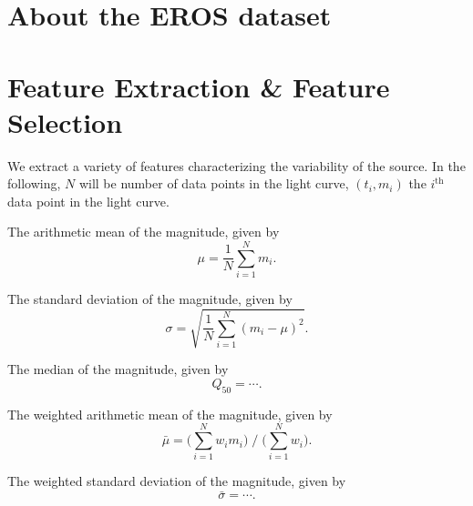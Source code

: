 \section{About the EROS dataset}


\section{Feature Extraction \& Feature Selection}

We extract a variety of features characterizing the variability of the source. In the following, $N$ will be number of data points in the light curve, $(t_i, m_i)$ the $i^{\text{th}}$ data point in the light curve.

\begin{enumerate}

 The arithmetic mean of the magnitude, given by
\begin{equation}\mu = \frac{1}{N} \sum\limits_{i=1}^{N} m_i.\end{equation}

 The standard deviation of the magnitude, given by
\begin{equation}\sigma = \sqrt{\frac{1}{N} \sum_{i=1}^N (m_i - \mu)^2}.\end{equation}

 The median of the magnitude, given by
\begin{equation}Q_{50} = \cdots.\end{equation}

 The weighted arithmetic mean of the magnitude, given by
\begin{equation}\bar \mu = \big(\sum\limits_{i=1}^{N} w_i m_i\big) \; / \; \big(\sum\limits_{i=1}^{N} w_i\big).\end{equation}

 The weighted standard deviation of the magnitude, given by
\begin{equation}\bar \sigma = \cdots.\end{equation}


\end{enumerate}
